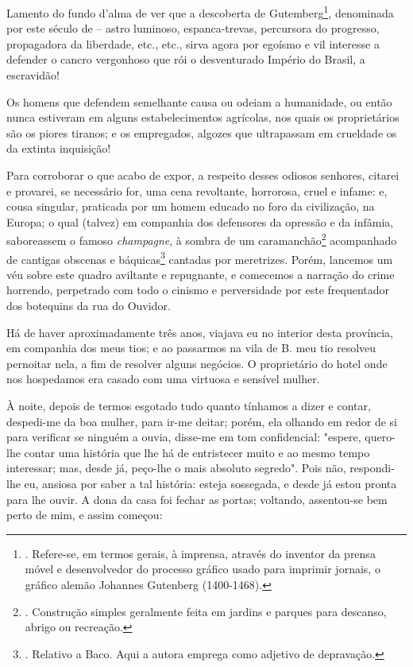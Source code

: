 Lamento do fundo d'alma de ver que a descoberta de Gutemberg\footnote{.
  Refere-se, em termos gerais, à imprensa, através do inventor da prensa
  móvel e desenvolvedor do processo gráfico usado para imprimir jornais,
  o gráfico alemão Johannes Gutenberg (1400-1468).}, denominada por este
século de -- astro luminoso, espanca-trevas, percursora do progresso,
propagadora da liberdade, etc., etc., sirva agora por egoísmo e vil
interesse a defender o cancro vergonhoso que rói o desventurado Império
do Brasil, a escravidão!

Os homens que defendem semelhante causa ou odeiam a humanidade, ou então
nunca estiveram em alguns estabelecimentos agrícolas, nos quais os
proprietários são os piores tiranos; e os empregados, algozes que
ultrapassam em crueldade os da extinta inquisição!

Para corroborar o que acabo de expor, a respeito desses odiosos
senhores, citarei e provarei, se necessário for, uma cena revoltante,
horrorosa, cruel e infame: e, cousa singular, praticada por um homem
educado no foro da civilização, na Europa; o qual (talvez) em companhia
dos defensores da opressão e da infâmia, saboreassem o famoso
\emph{champagne}, à sombra de um caramanchão\footnote{. Construção
  simples geralmente feita em jardins e parques para descanso, abrigo ou
  recreação.} acompanhado de cantigas obscenas e báquicas\footnote{.
  Relativo a Baco. Aqui a autora emprega como adjetivo de depravação.}
cantadas por meretrizes. Porém, lancemos um véu sobre este quadro
aviltante e repugnante, e comecemos a narração do crime horrendo,
perpetrado com todo o cinismo e perversidade por este frequentador dos
botequins da rua do Ouvidor.

Há de haver aproximadamente três anos, viajava eu no interior desta
província, em companhia dos meus tios; e ao passarmos na vila de B. meu
tio resolveu pernoitar nela, a fim de resolver alguns negócios. O
proprietário do hotel onde nos hospedamos era casado com uma virtuosa e
sensível mulher.

À noite, depois de termos esgotado tudo quanto tínhamos a dizer e
contar, despedi-me da boa mulher, para ir-me deitar; porém, ela olhando
em redor de si para verificar se ninguém a ouvia, disse-me em tom
confidencial: "espere, quero-lhe contar uma história que lhe há de
entristecer muito e ao mesmo tempo interessar; mas, desde já, peço-lhe o
mais absoluto segredo". Pois não, respondi-lhe eu, ansiosa por saber a
tal história: esteja sossegada, e desde já estou pronta para lhe ouvir.
A dona da casa foi fechar as portas; voltando, assentou-se bem perto de
mim, e assim começou:

